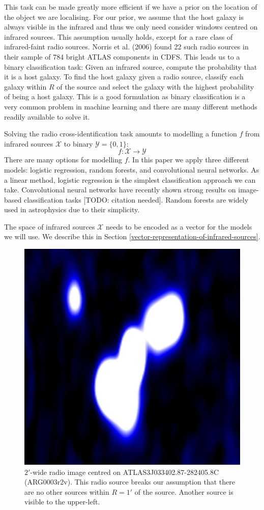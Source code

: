 \documentclass[fleqn,usenatbib,usedcolumn]{mnras}
\begin{document}
    This task can be made greatly more efficient if we have a prior on the
    location of the object we are localising. For our prior, we assume that
    the host galaxy is always visible in the infrared and thus we only need
    consider windows centred on infrared sources. This assumption usually
    holds, except for a rare class of infrared-faint radio sources. Norris et
    al. (2006) found 22 such radio sources in their sample of 784 bright ATLAS
    components in CDFS. This leads us to a binary classification task: Given
    an infrared source, compute the probability that it is a host galaxy. To
    find the host galaxy given a radio source, classify each galaxy within
    \(R\) of the source and select the galaxy with the highest probability of
    being a host galaxy. This is a good formulation as binary classification
    is a very common problem in machine learning and there are many different
    methods readily available to solve it.

    Solving the radio cross-identification task amounts to modelling a
    function \(f\) from infrared sources \(\mathcal{X}\) to binary
    \(\mathcal{Y} = \{0, 1\}\): \[
        f : \mathcal{X} \to \mathcal{Y}
    \] There are many options for modelling \(f\). In this paper we apply
    three different models: logistic regression, random forests, and
    convolutional neural networks. As a linear method, logistic regression is
    the simplest classification approach we can take. Convolutional neural
    networks have recently shown strong results on image-based classification
    tasks [TODO: citation needed]. Random forests are widely used in
    astrophysics due to their simplicity.

    The space of infrared sources \(\mathcal{X}\) needs to be encoded as a
    vector for the models we will use. We describe this in Section
    \ref{vector-representation-of-infrared-sources}.

    \begin{figure}
      \centering
      \includegraphics[width=0.5\linewidth]{images/ARG0003r2v_radio.png}
      \caption{$2'$-wide radio image centred on ATLAS3\textunderscore{}J033402.87-282405.8C
        (ARG0003r2v). This radio source breaks our assumption that there are
        no other sources within $R = 1'$ of the source. Another source is
        visible to the upper-left.}
      \label{fig:broken-isolation}
    \end{figure}
\end{document}

